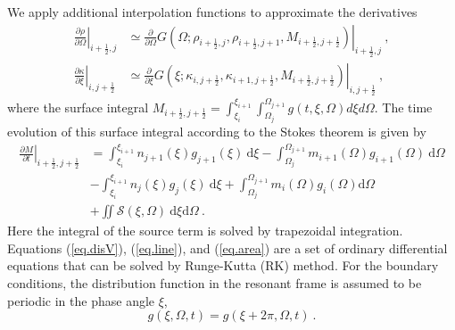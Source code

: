 We apply additional interpolation functions to approximate 
the derivatives
\begin{equation}
    \begin{aligned}
    \left.\frac{\partial \rho}{\partial \Omega}\right|_{i+\frac{1}{2},j}
    &\simeq \left.\frac{\partial}{\partial \Omega} G(\Omega;\rho_{i+\frac{1}{2},j},\rho_{i+\frac{1}{2},j+1}, M_{i+\frac{1}{2},j+\frac{1}{2}})\right|_{i+\frac{1}{2},j}~, \\
    \left.\frac{\partial \kappa}{\partial \xi}\right|_{i,j+\frac{1}{2}}
 &\simeq \left.\frac{\partial}{\partial \xi} G(\xi;\kappa_{i,j+\frac{1}{2}},\kappa_{i+1,j+\frac{1}{2}}, M_{i+\frac{1}{2},j+\frac{1}{2}})\right|_{i,j+\frac{1}{2}}~,
    \end{aligned}
\end{equation} 
where the surface integral $M_{i+\frac{1}{2},j+\frac{1}{2}}=\int_{\xi_i}^{\xi_{i+1}}\int_{\Omega_j}^{\Omega_{j+1}}g(t,\xi,\Omega)d\xi d\Omega$.
The time evolution of this surface integral according to the Stokes theorem is given by
\begin{equation}\label{eq.area}
    \begin{aligned}
         \left.\frac{\partial M}{\partial t}\right|_{i+\frac{1}{2},j+\frac{1}{2}}
         &= \int_{\xi_i}^{\xi_{i+1}} n_{j+1}(\xi) g_{j+1}(\xi)~\mathrm{d}\xi - \int_{\Omega_j}^{\Omega_{j+1}} m_{i+1}(\Omega) g_{i+1} (\Omega)~\mathrm{d} \Omega \\
        & - \int_{\xi_i}^{\xi_{i+1}} n_{j}(\xi) g_{j}(\xi)~\mathrm{d}\xi + \int_{\Omega_j}^{\Omega_{j+1}} m_{i}(\Omega) g_{i} (\Omega) \mathrm{d}\Omega \\
        &+ \iint \mathcal{S}(\xi,\Omega)~\mathrm{d}\xi\mathrm{d}\Omega~.
    \end{aligned}
\end{equation}
Here the integral of the source term is solved by trapezoidal integration.
Equations (\ref{eq.disV}), (\ref{eq.line}), and (\ref{eq.area})
are a set of ordinary differential equations that can be solved  by Runge-Kutta (RK) method.
For the boundary conditions, the distribution function in  the resonant frame is assumed to be periodic in the phase angle $\xi$,
\begin{equation}
    g\left(\xi,\Omega,t\right)=g\left(\xi+2 \pi,\Omega,t\right)~.
\end{equation}
